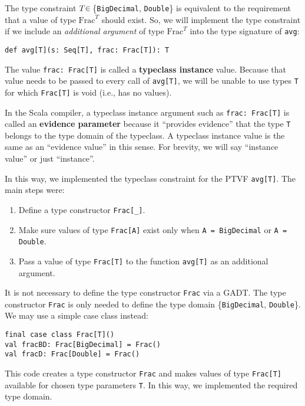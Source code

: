 The type constraint $T\negthickspace\in\,$\{\lstinline!BigDecimal!,
\lstinline!Double!\} is equivalent to the requirement that a value
of type $\text{Frac}^{T}$ should exist. So, we will implement the
type constraint if we include an \emph{additional argument} of type
$\text{Frac}^{T}$ into the type signature of \lstinline!avg!:
\begin{lstlisting}
def avg[T](s: Seq[T], frac: Frac[T]): T
\end{lstlisting}
The value \lstinline!frac: Frac[T]! is called a \textbf{typeclass
instance} value. Because that value needs to be passed to every call
of \lstinline!avg[T]!, we will be unable to use types \lstinline!T!
for which \lstinline!Frac[T]! is void (i.e., has no values). 

In the Scala compiler, a typeclass instance argument such as \lstinline!frac: Frac[T]!
is called an \textbf{evidence parameter} 
because it \textsf{``}provides evidence\textsf{''} that the type \lstinline!T! belongs
to the type domain of the typeclass. A typeclass instance value is
the same as an \textsf{``}evidence value\textsf{''} in this sense. For brevity, we
will say \textsf{``}instance value\textsf{''} or just \textsf{``}instance\textsf{''}.

In this way, we implemented the typeclass constraint for the PTVF
\lstinline!avg[T]!. The main steps were:
\begin{enumerate}
\item Define a type constructor \lstinline!Frac[_]!.
\item Make sure values of type \lstinline!Frac[A]! exist only when \lstinline!A = BigDecimal!
or \lstinline!A = Double!.
\item Pass a value of type \lstinline!Frac[T]! to the function \lstinline!avg[T]!
as an additional argument.
\end{enumerate}
It is not necessary to define the type constructor \lstinline!Frac!
via a GADT. The type constructor \lstinline!Frac! is only needed
to define the type domain \{\lstinline!BigDecimal!, \lstinline!Double!\}.
We may use a simple case class instead:
\begin{lstlisting}
final case class Frac[T]()
val fracBD: Frac[BigDecimal] = Frac()
val fracD: Frac[Double] = Frac()
\end{lstlisting}

\noindent This code creates a type constructor \lstinline!Frac! and
makes values of type \lstinline!Frac[T]! available for chosen type
parameters \lstinline!T!. In this way, we implemented the required
type domain.

